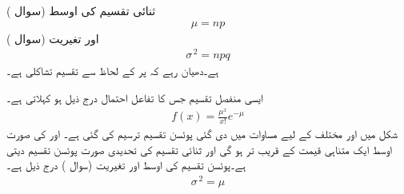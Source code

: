 ثنائی تقسیم کی اوسط (سوال )
\begin{align}\label{مساوات_شماریات_ثنائی_تقسیم_پ}
\mu=np
\end{align}
اور تغیریت  (سوال )
\begin{align}\label{مساوات_شماریات_ثنائی_تقسیم_ت}
\sigma^{\,2}=npq
\end{align}
ہے۔دھیان رہے کہ  پر  کے لحاظ سے تقسیم تشاکلی ہے۔

ایسی منفصل تقسیم جس کا تفاعل احتمال درج ذیل ہو  کہلاتی ہے۔ 
\begin{align}\label{مساوات_شماریات_پوئسن_تقسیم_الف}
f(x)=\frac{\mu^x}{x!}e^{-\mu}
\end{align}
شکل  میں  اور مختلف  کے لیے  مساوات  میں دی گئی پوئسن تقسیم ترسیم کی گئی ہے۔ اور  کی صورت اوسط  ایک متناہی قیمت کے قریب تر ہو گی اور  ثنائی تقسیم  کی  تحدیدی صورت  پوئسن تقسیم دیتی ہے۔پوئسن تقسیم کی اوسط  اور تغیریت (سوال ) درج ذیل ہے۔
\begin{align}\label{مساوات_شماریات_پوئسن_تقسیم_ب}
\sigma^{\,2}=\mu
\end{align}

